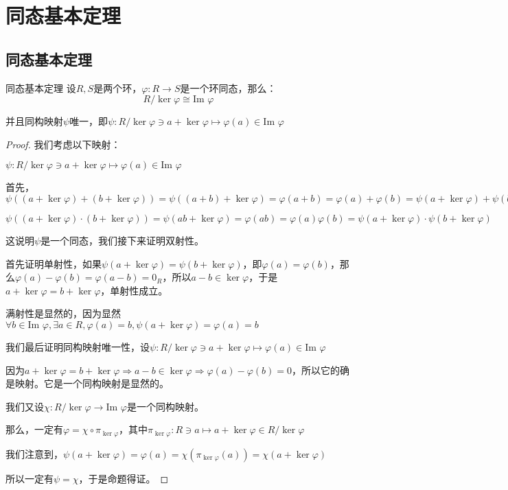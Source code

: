 \documentclass[12pt, a4paper, oneside, UTF8]{ctexbook}
\begin{document}
	\section{同态基本定理}
		\subsection{同态基本定理}
			\begin{them}{同态基本定理}{}
				设$R,S$是两个环，$\varphi : R \rightarrow S$是一个环同态，那么：
				\begin{equation}
					R / \ker \varphi \cong \text{Im }\varphi 
				\end{equation}

				并且同构映射$\psi $唯一，即$\psi : R / \ker \varphi \ni a+\ker \varphi  \mapsto \varphi (a) \in \text{Im }\varphi $
			\end{them}
			\begin{proof}
				我们考虑以下映射：

				$\psi : R / \ker \varphi \ni a+\ker \varphi  \mapsto \varphi (a) \in \text{Im }\varphi $

				首先，$\psi \left((a+\ker \varphi )+(b+\ker \varphi )\right)=\psi \left((a+b)+\ker \varphi \right)=\varphi (a+b)=\varphi (a)+\varphi (b)=\psi (a+\ker \varphi )+\psi (b+\ker \varphi )$
				
				$\psi \left((a+\ker \varphi )\cdot (b+\ker \varphi )\right)=\psi (ab+\ker \varphi )=\varphi (ab)=\varphi (a)\varphi (b)=\psi (a+\ker \varphi )\cdot \psi (b+\ker \varphi )$

				这说明$\psi $是一个同态，我们接下来证明双射性。

				首先证明单射性，如果$\psi (a+\ker \varphi )=\psi (b+\ker \varphi )$，即$\varphi (a)=\varphi (b)$，那么$\varphi (a)-\varphi (b)=\varphi (a-b)=0_R$，所以$a-b \in \ker \varphi $，于是$a+\ker \varphi =b+\ker \varphi $，单射性成立。

				满射性是显然的，因为显然$\forall b \in \text{Im }\varphi ,\exists a \in R,\varphi (a)=b,\psi (a+\ker \varphi )=\varphi (a)=b$

				我们最后证明同构映射唯一性，设$\psi : R / \ker \varphi \ni a+\ker \varphi  \mapsto \varphi (a) \in \text{Im }\varphi $
				
				因为$a+\ker \varphi =b+\ker \varphi \Rightarrow a-b \in \ker \varphi \Rightarrow \varphi (a)-\varphi (b)=0$，所以它的确是映射。它是一个同构映射是显然的。

				我们又设$\chi  : R / \ker \varphi \rightarrow \text{Im }\varphi $是一个同构映射。

				那么，一定有$\varphi =\chi \circ \pi_{\ker \varphi }$，其中$\pi_{\ker \varphi } : R \ni a \mapsto  a+\ker \varphi \in R/\ker \varphi $

				我们注意到，$\psi(a+\ker \varphi )=\varphi (a)=\chi \left(\pi_{\ker \varphi }(a)\right)=\chi(a+\ker \varphi )$
				
				所以一定有$\psi =\chi $，于是命题得证。
			\end{proof}
\end{document}
